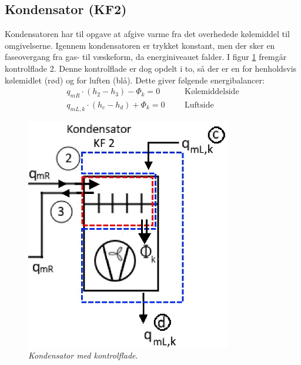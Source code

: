 \documentclass[../Hovedrapport.tex]{subfiles}
\begin{document}
\subsection{Kondensator (KF2)}
\begin{minipage}[t]{0.5\textwidth}
Kondensatoren har til opgave at afgive varme fra det overhedede kølemiddel til omgivelserne. Igennem kondensatoren er trykket konstant, men der sker en faseovergang fra gas- til væskeform, da energiniveauet falder.
I figur \ref{fig:Kondensator-KF} fremgår kontrolflade 2. Denne kontrolflade er dog opdelt i to, så der er en for henholdsvis kølemidlet (rød) og for luften (blå). Dette giver følgende energibalancer:
\begin{align}
\label{eq:kondensatorEB}
    q_{mR} \cdot (h_{2} - h_3) - \Phi_{k} = 0   &&&\text{Kølemiddelside} \\
    q_{mL,k} \cdot (h_{c}-h_{d}) + \Phi_{k} = 0       &&& \text{Luftside}
\end{align}
\end{minipage}
\begin{minipage}[t]{0.5\textwidth}
\vspace{-30pt}
\begin{figure}[H]
\centering
	\includegraphics[width=0.8\textwidth]{Billeder/KF_2}
	\caption{\textit{Kondensator med kontrolflade}.}
	\label{fig:Kondensator-KF}
\end{figure}
\end{minipage}
\end{document}
